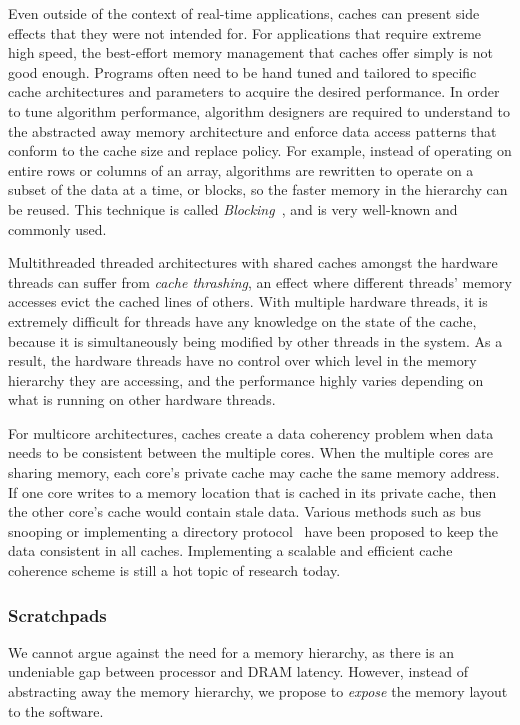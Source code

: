 Even outside of the context of real-time applications, caches can present side effects that they were not intended for.  
For applications that require extreme high speed, the best-effort memory management that caches offer simply is not good enough.
Programs often need to be hand tuned and tailored to specific cache architectures and parameters to acquire the desired performance. 
In order to tune algorithm performance, algorithm designers are required to understand to the abstracted away memory architecture and enforce data access patterns that conform to the cache size and replace policy.   
For example, instead of operating on entire rows or columns of an array, algorithms are rewritten to operate on a subset of the data at a time, or blocks, so the faster memory in the hierarchy can be reused.
This technique is called \emph{Blocking}~\cite{Lam91thecache}, and is very well-known and commonly used.   

Multithreaded threaded architectures with shared caches amongst the hardware threads can suffer from \emph{cache thrashing}, an effect where different threads' memory accesses evict the cached lines of others.
With multiple hardware threads, it is extremely difficult for threads have any knowledge on the state of the cache, because it is simultaneously being modified by other threads in the system. 
As a result, the hardware threads have no control over which level in the memory hierarchy they are accessing, and the performance highly varies depending on what is running on other hardware threads. 

For multicore architectures, caches create a data coherency problem when data needs to be consistent between the multiple cores.
When the multiple cores are sharing memory, each core's private cache may cache the same memory address. 
If one core writes to a memory location that is cached in its private cache, then the other core's cache would contain stale data. 
Various methods such as bus snooping or implementing a directory protocol~\cite{Stenstrom:1990:SCC:79809.79810} have been proposed to keep the data consistent in all caches. 
Implementing a scalable and efficient cache coherence scheme is still a hot topic of research today.

\subsubsection{Scratchpads}
We cannot argue against the need for a memory hierarchy, as there is an undeniable gap between processor and DRAM latency.
However, instead of abstracting away the memory hierarchy, we propose to \emph{expose} the memory layout to the software.  

